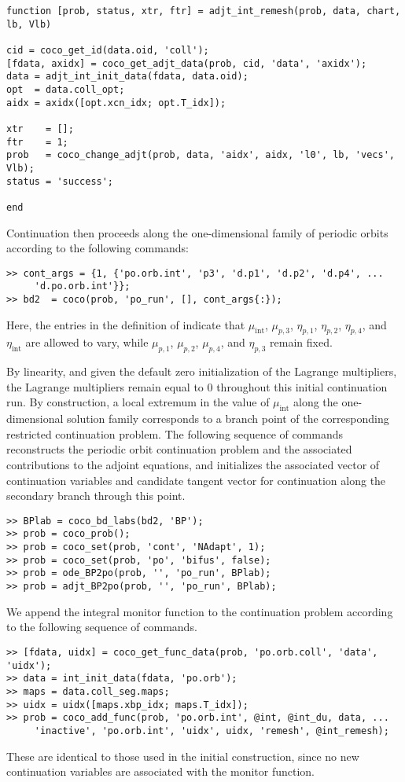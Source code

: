 \begin{lstlisting}[language=coco-highlight]
function [prob, status, xtr, ftr] = adjt_int_remesh(prob, data, chart, lb, Vlb)

cid = coco_get_id(data.oid, 'coll');
[fdata, axidx] = coco_get_adjt_data(prob, cid, 'data', 'axidx');
data = adjt_int_init_data(fdata, data.oid);
opt  = data.coll_opt;
aidx = axidx([opt.xcn_idx; opt.T_idx]);

xtr    = [];
ftr    = 1;
prob   = coco_change_adjt(prob, data, 'aidx', aidx, 'l0', lb, 'vecs', Vlb);
status = 'success';

end
\end{lstlisting}
Continuation then proceeds along the one-dimensional family of periodic orbits according to the following commands:
\begin{lstlisting}[language=coco-highlight]
>> cont_args = {1, {'po.orb.int', 'p3', 'd.p1', 'd.p2', 'd.p4', ...
     'd.po.orb.int'}};
>> bd2  = coco(prob, 'po_run', [], cont_args{:});
\end{lstlisting}
Here, the entries in the definition of  indicate that $\mu_\mathrm{int}$, $\mu_{p,3}$, $\eta_{p,1}$, $\eta_{p,2}$, $\eta_{p,4}$, and $\eta_\mathrm{int}$ are allowed to vary, while $\mu_{p,1}$, $\mu_{p,2}$, $\mu_{p,4}$, and $\eta_{p,3}$ remain fixed.

By linearity, and given the default zero initialization of the Lagrange multipliers, the Lagrange multipliers remain equal to $0$ throughout this initial continuation run. By construction, a local extremum in the value of $\mu_\mathrm{int}$ along the one-dimensional solution family corresponds to a branch point of the corresponding restricted continuation problem. The following sequence of commands reconstructs the periodic orbit continuation problem and the associated contributions to the adjoint equations, and initializes the associated vector of continuation variables and candidate tangent vector for continuation along the secondary branch through this point.
\begin{lstlisting}[language=coco-highlight]
>> BPlab = coco_bd_labs(bd2, 'BP');
>> prob = coco_prob();
>> prob = coco_set(prob, 'cont', 'NAdapt', 1);
>> prob = coco_set(prob, 'po', 'bifus', false);
>> prob = ode_BP2po(prob, '', 'po_run', BPlab);
>> prob = adjt_BP2po(prob, '', 'po_run', BPlab);
\end{lstlisting}
We append the integral monitor function to the continuation problem according to the following sequence of commands.
\begin{lstlisting}[language=coco-highlight]
>> [fdata, uidx] = coco_get_func_data(prob, 'po.orb.coll', 'data', 'uidx');
>> data = int_init_data(fdata, 'po.orb');
>> maps = data.coll_seg.maps;
>> uidx = uidx([maps.xbp_idx; maps.T_idx]);
>> prob = coco_add_func(prob, 'po.orb.int', @int, @int_du, data, ...
     'inactive', 'po.orb.int', 'uidx', uidx, 'remesh', @int_remesh);
\end{lstlisting}
These are identical to those used in the initial construction, since no new continuation variables are associated with the monitor function. 

